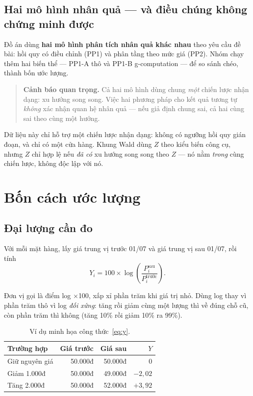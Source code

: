 \documentclass[11pt]{article}
\newcommand{\dvi}{điểm log $\times$100}
\begin{document}
\subsection{Hai mô hình nhân quả --- và điều chúng không chứng minh được}

Đồ án dùng \textbf{hai mô hình phân tích nhân quả khác nhau} theo yêu cầu đề bài: hồi quy có điều
chỉnh (PP1) và phân tầng theo mức giá (PP2). Nhóm chạy thêm hai biến thể --- PP1-A thô và PP1-B
g-computation --- để so sánh chéo, thành bốn ước lượng.

\begin{quote}
\textbf{Cảnh báo quan trọng.} Cả hai mô hình dùng chung \emph{một} chiến lược nhận dạng: xu hướng
song song. Việc hai phương pháp cho kết quả tương tự \emph{không} xác nhận quan hệ nhân quả --- nếu
giả định chung sai, cả hai cùng sai theo cùng một hướng.
\end{quote}

Dữ liệu này chỉ hỗ trợ một chiến lược nhận dạng: không có ngưỡng hồi quy gián đoạn, và chỉ có một
cửa hàng. Khung Wald dùng $Z$ theo kiểu biến công cụ, nhưng $Z$ chỉ hợp lệ nếu \emph{đã có} xu
hướng song song theo $Z$ --- nó nằm \emph{trong} cùng chiến lược, không độc lập với nó.

\section{Bốn cách ước lượng}
\label{sec:bon-cach}

\subsection{Đại lượng cần đo}

Với mỗi mặt hàng, lấy giá trung vị trước 01/07 và giá trung vị sau 01/07, rồi tính
\begin{equation}
  Y_i = 100 \times \log\!\left(\frac{P_i^{\text{sau}}}{P_i^{\text{trước}}}\right).
  \label{eq:y}
\end{equation}

Đơn vị gọi là \dvi{}, xấp xỉ phần trăm khi giá trị nhỏ. Dùng log thay vì phần trăm thô vì log
\emph{đối xứng}: tăng rồi giảm cùng một lượng thì về đúng chỗ cũ, còn phần trăm thì không (tăng
10\% rồi giảm 10\% ra 99\%).

\begin{table}[htbp]
  \centering
  \caption{Ví dụ minh họa công thức~\eqref{eq:y}.}
  \label{tab:vi-du-y}
  \begin{tabular}{lrrr}
    \toprule
    Trường hợp & Giá trước & Giá sau & $Y$ \\
    \midrule
    Giữ nguyên giá & 50.000đ & 50.000đ & $0$ \\
    Giảm 1.000đ    & 50.000đ & 49.000đ & $-2{,}02$ \\
    Tăng 2.000đ    & 50.000đ & 52.000đ & $+3{,}92$ \\
    \bottomrule
  \end{tabular}
\end{table}
\end{document}
